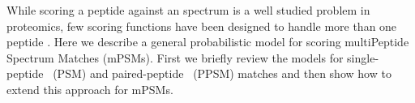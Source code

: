 \documentclass[arial,11pt]{article}
\begin{document}

While scoring a peptide against an spectrum is a well studied problem in proteomics, few scoring functions have been designed to handle more than one peptide \cite{zhang2005tree}.  Here we describe a general probabilistic model for scoring multiPeptide Spectrum Matches (mPSMs).  First we briefly review the models for single-peptide~\cite{kim2009} (PSM) and paired-peptide~\cite{wang2011peptide} (PPSM) matches and then show how to extend this approach for mPSMs.

\end{document}
